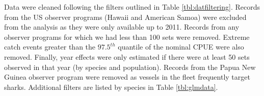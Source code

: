 Data were cleaned following the filters outlined in Table \ref{tbl:datfiltering}. Records from the US observer programs (Hawaii and American Samoa) were excluded from the analysis as they were only available up to 2011. Records from any observer programs for which we had less than 100 sets were removed. Extreme catch events greater than the $97.5^{th}$ quantile of the nominal CPUE were also removed. Finally, year effects were only estimated if there were at least 50 sets observed in that year (by species and population).  Records from the Papua New Guinea observer program were removed as vessels in the fleet frequently target sharks. Additional filters are listed by species in Table \ref{tbl:glmdata}.
                                                                                      
                                                                                       
